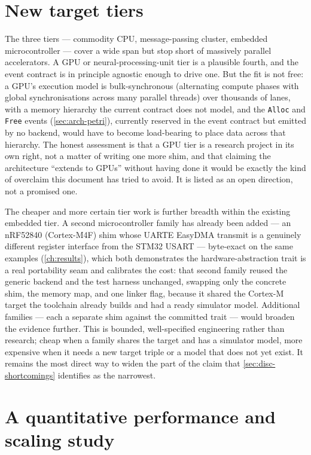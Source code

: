 \section{New target tiers}\label{sec:fw-tiers}

The three tiers --- commodity CPU, message-passing cluster, embedded
microcontroller --- cover a wide span but stop short of massively parallel
accelerators. A GPU or neural-processing-unit tier is a plausible fourth, and the
event contract is in principle agnostic enough to drive one. But the fit is not
free: a GPU's execution model is bulk-synchronous (alternating compute phases with global
synchronisations across many parallel threads) over thousands of lanes, with a
memory hierarchy the current contract does not model, and the \texttt{Alloc} and
\texttt{Free} events (\cref{sec:arch-petri}), currently reserved in the event
contract but emitted by no backend, would have to become load-bearing to place data
across that hierarchy. The honest assessment is that a
GPU tier is a research project in its own right, not a matter of writing one more
shim, and that claiming the architecture ``extends to GPUs'' without having done it
would be exactly the kind of overclaim this document has tried to avoid. It is
listed as an open direction, not a promised one.

The cheaper and more certain tier work is further breadth within the existing
embedded tier. A second microcontroller family has already been added --- an
nRF52840 (Cortex-M4F) shim whose UARTE EasyDMA transmit is a genuinely different
register interface from the STM32 USART --- byte-exact on the same examples
(\cref{ch:results}), which both demonstrates the hardware-abstraction trait is a
real portability seam and calibrates the cost: that second family reused the generic
backend and the test harness unchanged, swapping only the concrete shim, the memory
map, and one linker flag, because it shared the Cortex-M target the toolchain
already builds and had a ready simulator model. Additional families --- each a
separate shim against the committed trait --- would broaden the evidence further.
This is bounded, well-specified engineering rather than research; cheap when a family
shares the target and has a simulator model, more expensive when it needs a new
target triple or a model that does not yet exist. It remains the most direct way to
widen the part of the claim that \cref{sec:disc-shortcomings} identifies as the
narrowest.

\section{A quantitative performance and scaling study}\label{sec:fw-quant}

